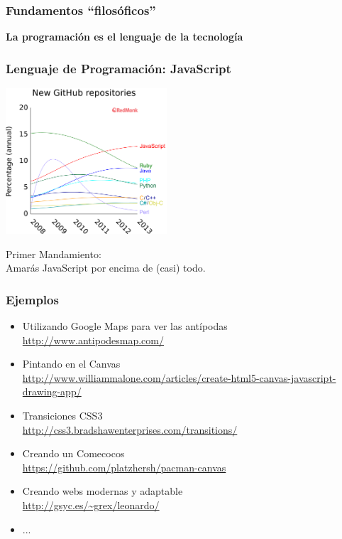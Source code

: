 \begin{frame}
\frametitle{Fundamentos ``filosóficos''}

\vspace{2.7cm}

\begin{center}
{\Huge \bf La programación es el lenguaje de la tecnología}
\end{center}

\end{frame}
\usebackgroundtemplate{}


\begin{frame}
\frametitle{Lenguaje de Programación: JavaScript}

\begin{center}
\includegraphics[width=6cm]{figs/2013-most-popular-on-github.png}
\end{center}

\begin{center}
\Large Primer Mandamiento: \\ Amarás JavaScript por encima de (casi) todo.
\end{center}


\end{frame}
\usebackgroundtemplate{}



\begin{frame}
\frametitle{Ejemplos}

\begin{itemize}
  \item Utilizando Google Maps para ver las antípodas \\ \url{http://www.antipodesmap.com/}
  \item Pintando en el Canvas \\ \url{http://www.williammalone.com/articles/create-html5-canvas-javascript-drawing-app/}
  \item Transiciones CSS3 \\ \url{http://css3.bradshawenterprises.com/transitions/}
  \item Creando un Comecocos \\ \url{https://github.com/platzhersh/pacman-canvas}
  \item Creando webs modernas y adaptable \\ \url{http://gsyc.es/~grex/leonardo/}
  \item ...
\end{itemize}

\end{frame}



